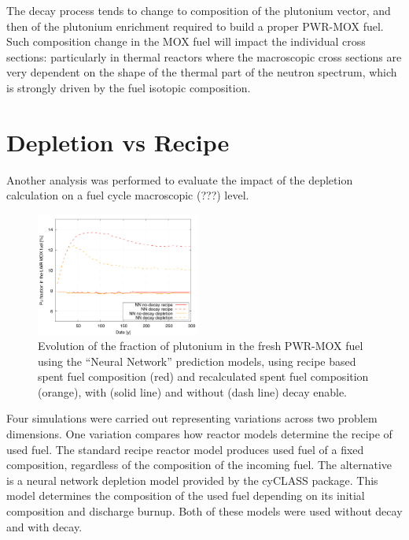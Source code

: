 \documentclass{anstrans}
\begin{document}
The decay process tends to change to composition of the plutonium vector, and
then of the plutonium enrichment required to build a proper PWR-MOX fuel.  Such
composition change in the MOX fuel will impact the individual cross sections:
particularly in thermal reactors where the macroscopic cross sections are very
dependent on the shape of the thermal part of the neutron spectrum, which is
strongly driven by the fuel isotopic composition.


\section{Depletion vs Recipe}

Another analysis was performed to evaluate the impact of the depletion
calculation on a fuel cycle macroscopic (???) level.

\begin{figure}[ht] %
  \centering
  \includegraphics[width=0.48\textwidth]{irradiation_pu_contribution.png}
  \caption{Evolution of the fraction of plutonium in the fresh PWR-MOX fuel
    using the ``Neural Network'' prediction models, using recipe based spent
    fuel composition (red) and recalculated spent fuel composition (orange),
    with (solid line) and without (dash line) decay enable.}
  \label{fig:depletion}
\end{figure}


Four simulations were carried out representing variations across two problem
dimensions.  One variation compares how reactor models determine the recipe of
used fuel.  The standard recipe reactor model produces used fuel of a fixed
composition, regardless of the composition of the incoming fuel.  The
alternative is a neural network depletion model provided by the cyCLASS
package.  This model determines the composition of the used fuel depending on
its initial composition and discharge burnup.  Both of these models were used
without decay and with decay.
\end{document}
